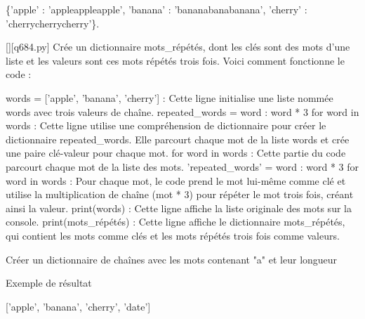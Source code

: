 \{'apple' : 'appleappleapple', 'banana' : 'bananabanabanana', 'cherry' : 'cherrycherrycherry'\}.
        \par
        \begin{solution}
            \renewcommand{\nomfichier}{q684.py}
            \pythonfile{\chemincode \nomfichier}[][\nomfichier]
            Crée un dictionnaire mots_répétés, dont les clés sont des mots d'une liste et les valeurs sont ces mots répétés trois fois. Voici comment fonctionne le code :

    words = ['apple', 'banana', 'cherry'] : Cette ligne initialise une liste nommée words avec trois valeurs de chaîne.
    repeated_words = {word : word * 3 for word in words} : Cette ligne utilise une compréhension de dictionnaire pour créer le dictionnaire repeated_words. Elle parcourt chaque mot de la liste words et crée une paire clé-valeur pour chaque mot.
        for word in words : Cette partie du code parcourt chaque mot de la liste des mots.
        'repeated_words' = {word : word * 3 for word in words} : Pour chaque mot, le code prend le mot lui-même comme clé et utilise la multiplication de chaîne (mot * 3) pour répéter le mot trois fois, créant ainsi la valeur.
    print(words) : Cette ligne affiche la liste originale des mots sur la console.
    print(mots_répétés) : Cette ligne affiche le dictionnaire mots_répétés, qui contient les mots comme clés et les mots répétés trois fois comme valeurs.
        \end{solution}
        

        \question
        Créer un dictionnaire de chaînes avec les mots contenant "a" et leur longueur

Exemple de résultat

['apple', 'banana', 'cherry', 'date']

